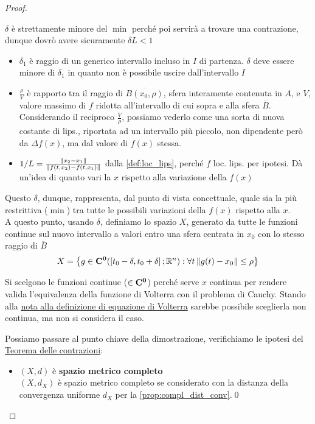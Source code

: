 \begin{proof}
\begin{note}
		$\delta$ è strettamente minore del $\min$ perché poi servirà a trovare una contrazione, dunque dovrò avere sicuramente $\delta L < 1$
	\end{note}
	\begin{itemize}
		\item $\delta_1$ è raggio di un generico intervallo incluso in $I$ di partenza. $\delta$ deve essere minore di $\delta_1$ in quanto non è possibile uscire dall'intervallo $I$
		\item $\frac{\rho}{V}$ è rapporto tra il raggio di $\overline{B(x_0,\rho)}$, sfera interamente contenuta in $A$, e $V$, valore massimo di $f$ ridotta all'intervallo di cui sopra e alla sfera $\overline{B}$.\\
		Considerando il reciproco $\frac{V}{\rho}$, possiamo vederlo come una sorta di nuova costante di lips., riportata ad un intervallo più piccolo, non dipendente però da $\Delta f(x)$, ma dal valore di $f(x)$ stessa.
		\item $1/L = \frac{\left\|x_2-x_1\right\|}{\left\|f(t,x_2)-f(t,x_1)\right\|}$ dalla \ref{def:loc_lips}, perché $f$ loc. lips. per ipotesi. Dà un'idea di quanto vari la $x$ rispetto alla variazione della $f(x)$
	\end{itemize}
	Questo $\delta$, dunque, rappresenta, dal punto di vista concettuale, quale sia la più restrittiva ($\min$) tra tutte le possibili variazioni della $f(x)$ rispetto alla $x$.\\
	A questo punto, usando $\delta$, definiamo lo spazio $X$, generato da tutte le funzioni continue sul nuovo intervallo a valori entro una sfera centrata in $x_0$ con lo stesso raggio di $\overline{B}$
	$$X = \left\{g\in \mathbf{C^{0}}(\left[t_0-\delta,t_0+\delta\right];\mathbb{R}^n):\forall t\left\|g(t)-x_0\right\|\leq \rho\right\}$$
	\begin{note}
		Si scelgono le funzioni continue ($\in \mathbf{C^{0}}$) perché serve $x$ continua per rendere valida l'equivalenza della funzione di Volterra con il problema di Cauchy. Stando alla \hyperlink{note:volterra_non_cont}{nota alla definizione di equazione di Volterra} sarebbe possibile sceglierla non continua, ma non si considera il caso.
	\end{note}
	Possiamo passare al punto chiave della dimostrazione, verifichiamo le ipotesi del \hyperref[teo:contrazioni]{Teorema delle contrazioni}:
	\begin{itemize}
		\item $(X,d)$ è \textbf{spazio metrico completo}\\
		$(X,d_X)$ è spazio metrico completo se considerato con la distanza della convergenza uniforme $d_X$ per la \ref{prop:compl_dist_conv}.\qed

\end{itemize}
\end{proof}

